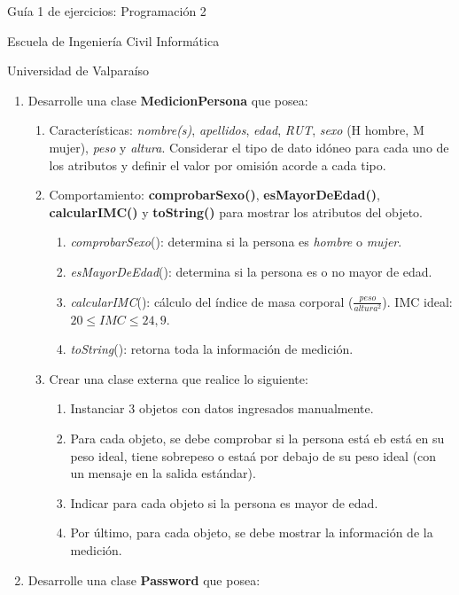 \documentclass{article}
\begin{document}
	\centerline{\sc \large Gu\'ia 1 de ejercicios: Programaci\'on 2}
	\centerline{\sc \normalsize Escuela de Ingenier\'ia Civil Inform\'atica}
	\centerline{\sc \normalsize  Universidad de Valpara\'iso}

	\vspace{1pc}

	\begin{enumerate}
		\item Desarrolle una clase \textbf{MedicionPersona} que posea:
		\begin{enumerate}
			\item Caracter\'isticas: \emph{nombre(s)}, \emph{apellidos}, \emph{edad}, \emph{RUT}, \emph{sexo} (H hombre, M mujer), \emph{peso} y \emph{altura}. Considerar el tipo de dato id\'oneo para cada uno de los atributos y definir el valor por omisi\'on acorde a cada tipo.
			\item Comportamiento: \textbf{comprobarSexo()}, \textbf{esMayorDeEdad()}, \textbf{calcularIMC()} y \textbf{toString()} para mostrar los atributos del objeto. 
			\begin{enumerate}
				\item \emph{comprobarSexo}(): determina si la persona es \emph{hombre} o \emph{mujer}.
				\item \emph{esMayorDeEdad}(): determina si la persona es o no mayor de edad.
				\item \emph{calcularIMC}(): c\'alculo del \'indice de masa corporal ($\frac{peso}{altura^{2}}$). IMC ideal: $20 \leq IMC \leq 24,9$.
				\item \emph{toString}(): retorna toda la informaci\'on de medici\'on.
			\end{enumerate}
			\item[] Crear una clase externa que realice lo siguiente:
			\begin{enumerate}
				\item Instanciar 3 objetos con datos ingresados manualmente.
				\item Para cada objeto, se debe comprobar si la persona est\'a eb est\'a en su peso ideal, tiene sobrepeso o esta\'a por debajo de su peso ideal (con un mensaje en la salida est\'andar).
				\item Indicar para cada objeto si la persona es mayor de edad.
				\item Por \'ultimo, para cada objeto, se debe mostrar la informaci\'on de la medici\'on.
			\end{enumerate}
		\end{enumerate}
		\item Desarrolle una clase \textbf{Password} que posea:

\end{enumerate}
\end{document}
